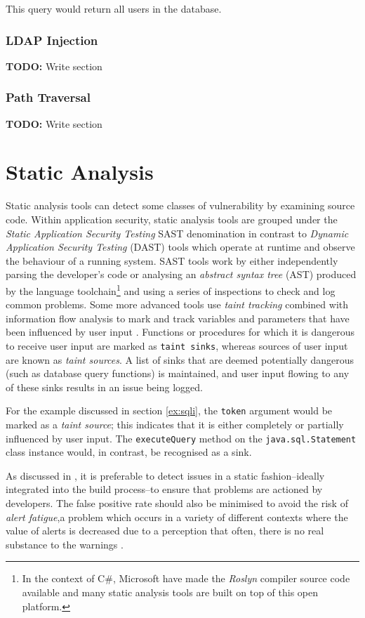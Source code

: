 \documentclass[a4paper,openany,12pt]{book}
\newcommand{\todobox}[1] {\colorbox{todocolor}{\parbox{\dimexpr \linewidth-\columnsep}{\vspace{.75\baselineskip}\centering\parbox{0.95\linewidth}{\faIcon{lightbulb} \textbf{TODO:} #1\vspace{.75\baselineskip}}}}}
\begin{document}
This query would return all users in the database.

\subsubsection{LDAP Injection}
\todobox{Write section}


\subsubsection{Path Traversal}
\todobox{Write section}

\section{Static Analysis}

Static analysis tools can detect some classes of vulnerability by examining source code.
Within application security, static analysis tools are grouped under the \emph{Static Application Security Testing} SAST
denomination in contrast to \emph{Dynamic Application Security Testing} (DAST) tools which operate at runtime and
observe the behaviour of a running system.
SAST tools work by either independently parsing the developer's code or
analysing an \emph{abstract syntax tree} (AST) produced by the language toolchain\footnote{%
    In the context of C\#, Microsoft have made the \emph{Roslyn} compiler source code available and many static analysis
    tools are built on top of this open platform.}
and using a series of inspections to check and log common problems.
Some more advanced tools use \emph{taint tracking} combined with information flow analysis to mark and track variables
and parameters that have been influenced by user input \citep{denning1977certification}.
Functions or procedures for which it is dangerous to receive user input are marked as \texttt{taint sinks}, whereas
sources of user input are known as \emph{taint sources}.
A list of sinks that are deemed potentially dangerous (such as database query functions) is maintained, and user input
flowing to any of these sinks results in an issue being logged.

For the example discussed in section \ref{ex:sqli}, the \texttt{token} argument would be marked as a
\emph{taint source}; this indicates that it is either completely or partially influenced by user input.
The \texttt{executeQuery} method on the \texttt{java.sql.Statement} class instance would, in contrast, be recognised
as a sink.

As discussed in \citet{sadowski2018lessons}, it is preferable to detect issues in a static fashion--ideally integrated
into the build process--to ensure that problems are actioned by developers.
The false positive rate should also be minimised to avoid the risk of \emph{alert fatigue},a problem which occurs in a
variety of different contexts where the value of alerts is decreased due to a perception that often, there is no real
substance to the warnings \citep{kesselheim2011clinical}.
\end{document}
